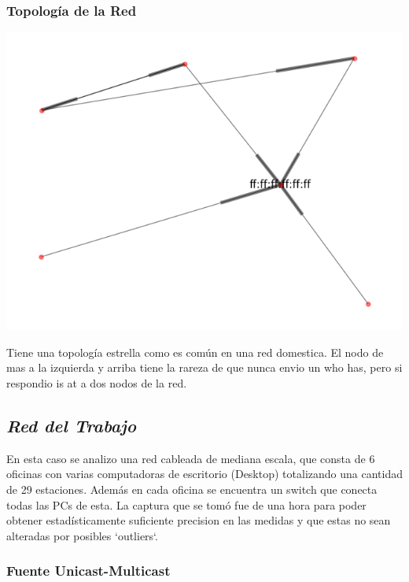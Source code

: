 \subsubsection{Topolog\'ia de la Red}
\begin{center}
 \includegraphics[scale=0.6]{../plots/mauro_s2_topologia.png}
\end{center}

Tiene una topolog\'ia estrella como es com\'un en una red domestica. El nodo de mas a la izquierda y
arriba tiene la rareza de que nunca envio un who has, pero si respondio is at a dos nodos de la red.

\subsection{\emph{Red del Trabajo}}

En esta caso se analizo una red cableada de mediana escala, que consta de 6
oficinas con varias computadoras de escritorio (Desktop) totalizando una
cantidad de 29 estaciones. Además en cada oficina se encuentra un switch que
conecta todas las PCs de esta. La captura que se tomó fue de una hora para
poder obtener estadísticamente suficiente precision en las medidas y que estas
no sean alteradas por posibles `outliers`.

\subsubsection{Fuente Unicast-Multicast}

